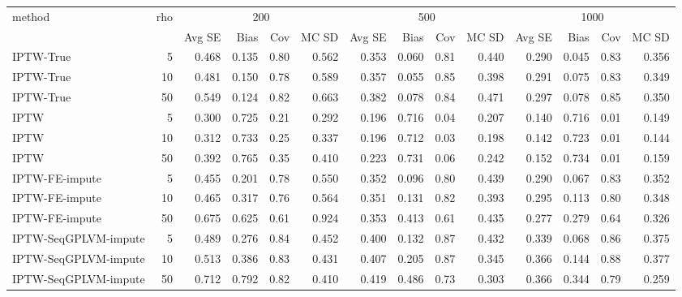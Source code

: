 \begin{tabular}{l r|rrrr|rrrr|rrrr}
\toprule
method & rho & \multicolumn{4}{c|}{200} & \multicolumn{4}{c|}{500} & \multicolumn{4}{c}{1000} \\
 &  & Avg SE & Bias & Cov & MC SD & Avg SE & Bias & Cov & MC SD & Avg SE & Bias & Cov & MC SD \\
\midrule
IPTW-True & 5 & 0.468 & 0.135 & 0.80 & 0.562 & 0.353 & 0.060 & 0.81 & 0.440 & 0.290 & 0.045 & 0.83 & 0.356 \\
IPTW-True & 10 & 0.481 & 0.150 & 0.78 & 0.589 & 0.357 & 0.055 & 0.85 & 0.398 & 0.291 & 0.075 & 0.83 & 0.349 \\
IPTW-True & 50 & 0.549 & 0.124 & 0.82 & 0.663 & 0.382 & 0.078 & 0.84 & 0.471 & 0.297 & 0.078 & 0.85 & 0.350 \\
IPTW & 5 & 0.300 & 0.725 & 0.21 & 0.292 & 0.196 & 0.716 & 0.04 & 0.207 & 0.140 & 0.716 & 0.01 & 0.149 \\
IPTW & 10 & 0.312 & 0.733 & 0.25 & 0.337 & 0.196 & 0.712 & 0.03 & 0.198 & 0.142 & 0.723 & 0.01 & 0.144 \\
IPTW & 50 & 0.392 & 0.765 & 0.35 & 0.410 & 0.223 & 0.731 & 0.06 & 0.242 & 0.152 & 0.734 & 0.01 & 0.159 \\
IPTW-FE-impute & 5 & 0.455 & 0.201 & 0.78 & 0.550 & 0.352 & 0.096 & 0.80 & 0.439 & 0.290 & 0.067 & 0.83 & 0.352 \\
IPTW-FE-impute & 10 & 0.465 & 0.317 & 0.76 & 0.564 & 0.351 & 0.131 & 0.82 & 0.393 & 0.295 & 0.113 & 0.80 & 0.348 \\
IPTW-FE-impute & 50 & 0.675 & 0.625 & 0.61 & 0.924 & 0.353 & 0.413 & 0.61 & 0.435 & 0.277 & 0.279 & 0.64 & 0.326 \\
IPTW-SeqGPLVM-impute & 5 & 0.489 & 0.276 & 0.84 & 0.452 & 0.400 & 0.132 & 0.87 & 0.432 & 0.339 & 0.068 & 0.86 & 0.375 \\
IPTW-SeqGPLVM-impute & 10 & 0.513 & 0.386 & 0.83 & 0.431 & 0.407 & 0.205 & 0.87 & 0.345 & 0.366 & 0.144 & 0.88 & 0.377 \\
IPTW-SeqGPLVM-impute & 50 & 0.712 & 0.792 & 0.82 & 0.410 & 0.419 & 0.486 & 0.73 & 0.303 & 0.366 & 0.344 & 0.79 & 0.259 \\
\bottomrule
\end{tabular}